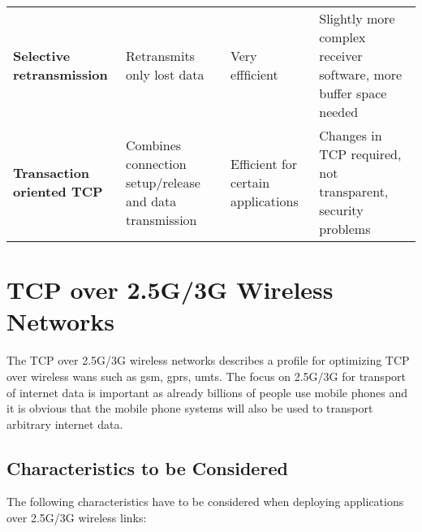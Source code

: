 \begin{landscape}
\begin{longtable}[ht!]{@{}>{\raggedright\arraybackslash}p{3cm}>{\raggedright\arraybackslash}p{4.1cm}>{\raggedright\arraybackslash}p{4.1cm}>{\raggedright\arraybackslash}p{4.1cm}@{}}
	\textbf{Selective retransmission} & Retransmits only lost data & Very effficient & Slightly more complex receiver software, more buffer space needed \tabularnewline


	\textbf{Transaction oriented TCP} & Combines connection setup/release and data transmission & Efficient for certain applications & Changes in TCP required,
	not transparent, security problems \tabularnewline
		
	\bottomrule
	
\end{longtable}
\end{landscape}
%
%
%
%
%

\section{TCP over 2.5G/3G Wireless Networks}
The TCP over 2.5G/3G wireless networks describes a profile for optimizing TCP over wireless \gls{wan}s such as \gls{gsm}, \gls{gprs}, \gls{umts}. The focus on 2.5G/3G for transport of internet data is important as already billions of people use mobile phones and it is obvious that the mobile phone systems will also be used to transport arbitrary internet data.

\subsection[Characteristics]{Characteristics to be Considered}{\label{sec:characteristics_2_3_g}}
The following characteristics have to be considered when deploying applications over 2.5G/3G wireless links:

